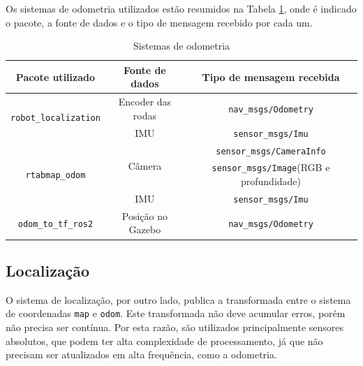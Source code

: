 \documentclass[repeatfields,xlists,xpacks,oneside,yearsonly]{ufrgscca}
\begin{document}
Os sistemas de odometria utilizados estão resumidos na Tabela
\ref{tab:odometria}, onde é indicado o pacote, a fonte de dados e o
tipo de mensagem recebido por cada um.

\begin{table}[h]
    \begin{center}
        \caption{Sistemas de odometria}
        \label{tab:odometria}
        \begin{tabular}{c|c|c}
            Pacote utilizado                              & Fonte de dados          & Tipo de mensagem recebida                       \\
            \hline
            \multirow{2}{*}{\texttt{robot\_localization}} & Encoder das rodas       & \texttt{nav\_msgs/Odometry}                     \\
                                                          & IMU                     & \texttt{sensor\_msgs/Imu}                       \\
            \hline
            \multirow{3}{*}{\texttt{rtabmap\_odom}}       & \multirow{2}{*}{Câmera} & \texttt{sensor\_msgs/CameraInfo}                \\
                                                          &                         & \texttt{sensor\_msgs/Image}(RGB e profundidade) \\
                                                          & IMU                     & \texttt{sensor\_msgs/Imu}                       \\
            \hline
            \texttt{odom\_to\_tf\_ros2}                   & Posição no Gazebo       & \texttt{nav\_msgs/Odometry}                     \\
        \end{tabular}
    \end{center}
\end{table}

\subsection{Localização}
\label{met:localizacao}

O sistema de localização, por outro lado, publica a transformada
entre o sistema de coordenadas \texttt{map} e \texttt{odom}. Este
transformada não deve acumular erros, porém não precisa ser contínua.
Por esta razão, são utilizados principalmente sensores absolutos, que
podem ter alta complexidade de processamento, já que não precisam ser
atualizados em alta frequência, como a odometria.
\end{document}
